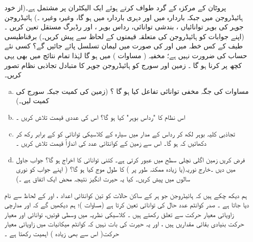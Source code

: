    پروٹان  کے مرکزہ کے گرد طواف کرتے ہوئے  ایک  الیکٹران  پر مشتمل  ہے۔(از  خود ہائیڈروجن  میں      جبکہ    باردارہ  میں   اور دہری باردارہ    میں    ہو گا،  وغیرہ وغیرہ ۔)   ہائیڈروجن  جوہر کی بوہر  توانائیاں  ،  بندشی  توانائی،   رداس بوہر  ،  اور رڈبرگ  مستقل  
 تعین کریں ۔ (اپنے جوابات کو  ہائیڈروجن  کی متعلقہ قیمتوں کے لحاظ سے پیش کریں۔)   برقناطیسی طیف کے کس خطہ میں   اور   کی صورت میں   لیمان   تسلسل پائے جائیں گے؟    کسی نئے   حساب کی ضرورت نہیں ہے؛   مخفیہ (  مساوات )   میں    ہو گا لہٰذا تمام  نتائج میں بھی یہی کچھ پر کرنا  ہو  گا  ۔
زمین اور سورج کو ہائیڈروجن  جوہر کا متبادل تجاذبی نظام تصور کریں۔
\begin{enumerate}[a.]
\item
 مساوات    کی جگہ مخفی توانائی تفاعل کیا  ہو گا ؟  (زمین کی کمیت   جبکہ سورج کی کمیت  لیں۔)
\item
اس نظام کا   "رداس بوہر"    کیا ہو گا؟ اس کی عددی قیمت تلاش کریں ۔
\item
تجاذبی کلیہ  بوہر  لکھ کر  رداس   کے مدار میں سیارہ  کے کلاسیکی توانائی کو   کے برابر رکھ کر  دکھائیں کہ  ہو گا۔ اس سے زمین کے کوانٹائی  عدد  کی اندازاً قیمت تلاش کریں ۔
\item
فرض کریں  زمین  اگلی نچلی سطح    میں عبور کرتی  ہے۔  کتنی توانائی  کا اخراج ہو گا؟  جواب   جاول   میں دیں ۔خارج   نوریہ(یا   زیادہ ممکنہ طور پر )   کا طول موج کیا ہو گا؟ ( اپنے جواب کو نوری سالوں میں پیش کریں۔ کیا یہ حیرت انگیز  نتیجہ محض ایک اتفاق ہے ۔)
\end{enumerate}

ہم دیکھ چکے ہیں کہ ہائیڈروجن جو ہر کے ساکن حالات کو تین کوانٹائی اعداد ،   اور  کے لحاظ سے نام دیا جاتا ہے ۔ صدر کوانٹم عدد   حال کی توانائی تعین کرتا ہے  (مساوات  )؛  ہم دیکھیں گے کہ  اور  مدارچی زاویائی معیار حرکت سے تعلق رکھتے ہیں ۔ کلاسیکی نظریہ میں وسطی قوتیں،  توانائی اور معیار حرکت بنیادی بقائی مقداریں ہیں ،  اور یہ حیرت کی  بات نہیں  کہ کوانٹم میکانیات میں  زاویائی معیار حرکت( اس سے بھی زیادہ ) اہمیت  رکھتا ہے ۔

